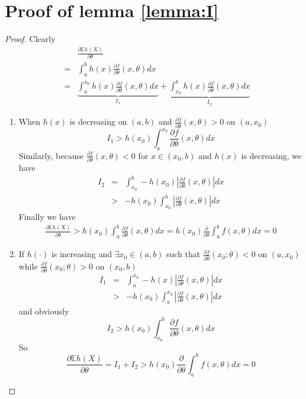 \documentclass{article}
\newcommand{\pd}[2]{
  \frac{\partial #1}{\partial #2}
}
\newcommand{\opd}[1]{
  \frac{\partial}{\partial #1}
}
\newcommand{\E}{
  \mathbb{E}
}
\newcommand{\1}[1]{
  \mathbf{1}_{\{#1\}}
}
\begin{document}
\appendix
\section{Proof of lemma \ref{lemma:I}}
\begin{proof}
  Clearly
  \begin{eqnarray*}
    && \pd{\E h(X)}{\theta} \\
    &=& \int_a^b h(x) \pd{f}{\theta}(x, \theta) dx \\
    &=& \underbrace{\int_a^{x_0} h(x) \pd{f}{\theta}(x, \theta) dx}_{I_1}
    + \underbrace{\int_{x_0}^b h(x) \pd{f}{\theta}(x, \theta) dx}_{I_2}
  \end{eqnarray*}
  \begin{enumerate}
  \item When $h(x)$ is decreasing on $(a, b)$ and $\pd{f}{\theta}(x,
    \theta) > 0$ on $(a, x_0)$
    \[
    I_1 > h(x_0) \int_a^{x_0} \pd{f}{\theta}(x, \theta) dx
    \]
    Similarly, because $\pd{f}{\theta}(x, \theta) < 0$ for $x \in (x_0, b)$ and
    $h(x)$ is decreasing, we have
    \begin{eqnarray*}
      I_2 &=& \int_{x_0}^b -h(x_0)
      \left|\pd{f}{\theta}(x, \theta) \right| dx \\
      &>& -h(x_0)
      \int_{x_0}^b \left| 
        \pd{f}{\theta}(x, \theta)
      \right| dx
    \end{eqnarray*}
    Finally we have
    \begin{eqnarray*}
      \pd{\E h(X)}{\theta}
      > h(x_0) \int_a^b \pd{f}{\theta}(x, \theta) dx
      = h(x_0) \opd{\theta} \int_a^b f(x, \theta) dx
      = 0
    \end{eqnarray*}
  \item If $h(\cdot)$ is increasing and $\exists x_0 \in (a, b)$ such that 
    $\pd{f}{\theta}(x_0; \theta) < 0$ on $(a, x_0)$  while
    $\pd{f}{\theta}(x_0; \theta) > 0$ on $(x_0, b)$
    \begin{eqnarray*}
      I_1 &=&
      \int_a^{x_0} -h(x)
      \left| \pd{f}{\theta}(x, \theta) \right| dx \\
      &>&
      -h(x_0) \int_a^{x_0}
      \left| \pd{f}{\theta}(x, \theta) \right| dx
    \end{eqnarray*}
    and obviously
    \[
    I_2 > h(x_0) \int_{x_0}^b
    \pd{f}{\theta}(x, \theta) dx
    \]
    So
    \[
    \pd{\E h(X)}{\theta}
    = I_1 + I_2
    > h(x_0) \opd{\theta} \int_a^b f(x, \theta) dx = 0
    \]
  \end{enumerate}
\end{proof}
\end{document}
